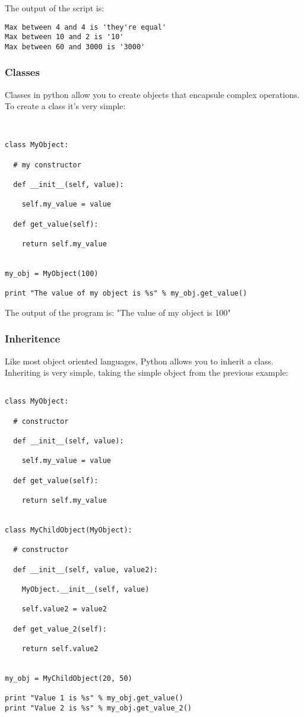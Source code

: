 \documentclass[12pt]{article}
\begin{document}
The output of the script is:

\begin{verbatim}
Max between 4 and 4 is 'they're equal'
Max between 10 and 2 is '10'
Max between 60 and 3000 is '3000'
\end{verbatim}

\subsubsection*{Classes}

Classes in python allow you to create objects that encapsule complex operations. To create a class it's very simple:

\begin{verbatim}


class MyObject:

  # my constructor
  
  def __init__(self, value):
  
    self.my_value = value
    
  def get_value(self):
  
    return self.my_value
    
   
my_obj = MyObject(100)
  
print "The value of my object is %s" % my_obj.get_value()

\end{verbatim}

The output of the program is: "The value of my object is 100"

\subsubsection*{Inheritence}

Like most object oriented languages, Python allows you to inherit a class. Inheriting is very simple, taking the simple object from the previous example:


\begin{verbatim}

class MyObject:

  # constructor
  
  def __init__(self, value):
  
    self.my_value = value
    
  def get_value(self):
  
    return self.my_value
    

class MyChildObject(MyObject):

  # constructor
  
  def __init__(self, value, value2): 
  
    MyObject.__init__(self, value)
    
    self.value2 = value2
    
  def get_value_2(self):
    
    return self.value2
      
  
my_obj = MyChildObject(20, 50)
  
print "Value 1 is %s" % my_obj.get_value()
print "Value 2 is %s" % my_obj.get_value_2()


  
\end{verbatim}
\end{document}

